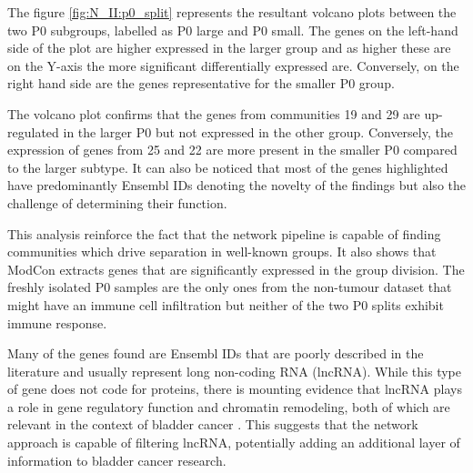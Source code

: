 The figure \cref{fig:N_II:p0_split} represents the resultant volcano plots between the two P0 subgroups, labelled as P0 large and P0 small. The genes on the left-hand side of the plot are higher expressed in the larger group and as higher these are on the Y-axis the more significant differentially expressed are. Conversely, on the right hand side are the genes representative for the smaller P0 group.

The volcano plot confirms that the genes from communities 19 and 29 are up-regulated in the larger P0 but not expressed in the other group. Conversely, the expression of genes from 25 and 22 are more present in the smaller P0 compared to the larger subtype. It can also be noticed that most of the genes highlighted have predominantly Ensembl IDs denoting the novelty of the findings but also the challenge of determining their function. 

This analysis reinforce the fact that the network pipeline is capable of finding communities which drive separation in well-known groups. It also shows that ModCon extracts genes that are significantly expressed in the group division. The freshly isolated P0 samples are the only ones from the non-tumour dataset that might have an immune cell infiltration but neither of the two P0 splits exhibit immune response. 

Many of the genes found are Ensembl IDs that are poorly described in the literature and usually represent long non-coding RNA (lncRNA). While this type of gene does not code for proteins, there is mounting evidence that lncRNA plays a role in gene regulatory function and chromatin remodeling, both of which are relevant in the context of bladder cancer \citep{Statello2021-md}. This suggests that the network approach is capable of filtering lncRNA, potentially adding an additional layer of information to bladder cancer research.




